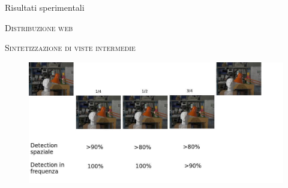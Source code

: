 \documentclass{beamer}
\begin{document}
\begin{section}{Risultati sperimentali}
\begin{frame}[t]{\textsc{Distribuzione web}}
\begin{table}
\vspace{2mm}
\caption{Valore medio di PSNR per diversi livelli di compressione}
\end{table}
\begin{table}
\vspace{2mm}
\caption{Statistica della detection in frequenza per video caricati su Youtube}
\end{table}

\end{frame}
\begin{frame}[t]{\textsc{Sintetizzazione di viste intermedie}}

\begin{figure}
\vspace{1mm}
  \includegraphics[width=1.1\textwidth]{./img_wat/synt.jpg}  
  \caption{} 
  \label{fig:vsg1}
\end{figure}



\end{frame}
\end{section}
\end{document}
